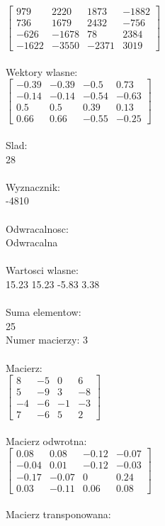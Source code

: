 \documentclass[a4paper,12pt]{article}
\begin{document}
$\begin{bmatrix} 979&2220&1873&-1882\\736&1679&2432&-756\\-626&-1678&78&2384\\-1622&-3550&-2371&3019 \end{bmatrix}$
\\
\\
Wektory wlasne:\\

$\begin{bmatrix} -0.39&-0.39&-0.5&0.73\\-0.14&-0.14&-0.54&-0.63\\0.5&0.5&0.39&0.13\\0.66&0.66&-0.55&-0.25 \end{bmatrix}$
\\
\\
Slad:\\
28
\\
\\
Wyznacznik:\\
-4810
\\
\\
Odwracalnosc:\\
Odwracalna
\\
\\
Wartosci wlasne:\\
15.23 15.23 -5.83 3.38
\\
\\
Suma elementow:\\
25
\\
\newpage
Numer macierzy:
3
\\
\\
Macierz:\\

$\begin{bmatrix} 8&-5&0&6\\5&-9&3&-8\\-4&-6&-1&-3\\7&-6&5&2 \end{bmatrix}$
\\
\\
Macierz odwrotna:\\

$\begin{bmatrix} 0.08&0.08&-0.12&-0.07\\-0.04&0.01&-0.12&-0.03\\-0.17&-0.07&0&0.24\\0.03&-0.11&0.06&0.08 \end{bmatrix}$
\\
\\
Macierz transponowana:\\
\end{document}
